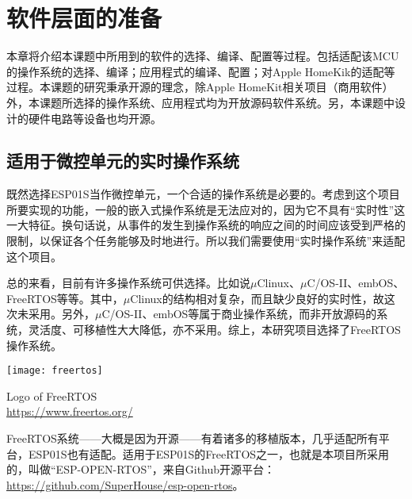 \setchapterpreamble[u]{\margintoc}
\chapter{软件层面的准备}

\setlength\parindent{2em} 本章将介绍本课题中所用到的软件的选择、编译、配置等过程。包括适配该MCU的操作系统的选择、编译；应用程式的编译、配置；对Apple HomeKik的适配等过程。本课题的研究秉承开源的理念，除Apple HomeKit相关项目（商用软件）外，本课题所选择的操作系统、应用程式均为开放源码软件系统。另，本课题中设计的硬件电路等设备也均开源。

\section{适用于微控单元的实时操作系统}

\setlength\parindent{2em} 既然选择ESP01S当作微控单元，一个合适的操作系统是必要的。考虑到这个项目所要实现的功能，一般的嵌入式操作系统是无法应对的，因为它不具有“实时性”这一大特征。换句话说，从事件的发生到操作系统的响应之间的时间应该受到严格的限制，以保证各个任务能够及时地进行。所以我们需要使用“实时操作系统”来适配这个项目。

\par 总的来看，目前有许多操作系统可供选择。比如说$\mu$Clinux、$\mu$C/OS-II、embOS、FreeRTOS等等。其中，$\mu$Clinux的结构相对复杂，而且缺少良好的实时性，故这次未采用。另外，$\mu$C/OS-II、embOS等属于商业操作系统，而非开放源码的系统，灵活度、可移植性大大降低，亦不采用。综上，本研究项目选择了FreeRTOS操作系统。

\begin{marginfigure}[-0.5cm]
	\texttt{[image: freertos]}
	\caption[freertos]{Logo of FreeRTOS\\
	\url{https://www.freertos.org/}}
\end{marginfigure}


\par FreeRTOS系统——大概是因为开源——有着诸多的移植版本，几乎适配所有平台，ESP01S也有适配。适用于ESP01S的FreeRTOS之一，也就是本项目所采用的，叫做“ESP-OPEN-RTOS”，来自Github开源平台：\\
\url{https://github.com/SuperHouse/esp-open-rtos}。

